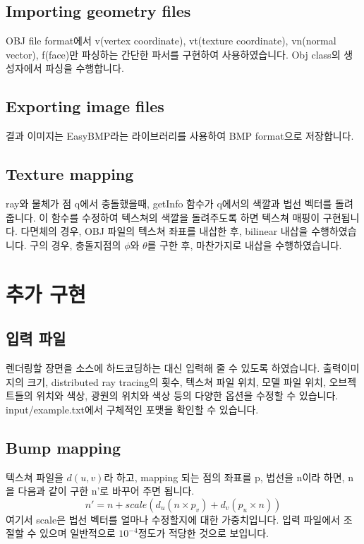 \documentclass{article}
\begin{document}
\subsection{Importing geometry files}

OBJ file format에서 v(vertex coordinate), vt(texture coordinate), vn(normal vector), f(face)만 파싱하는 간단한 파서를 구현하여 사용하였습니다.
Obj class의 생성자에서 파싱을 수행합니다.

\subsection{Exporting image files}

결과 이미지는 EasyBMP라는 라이브러리를 사용하여 BMP format으로 저장합니다.

\subsection{Texture mapping}

ray와 물체가 점 q에서 충돌했을때, getInfo 함수가 q에서의 색깔과 법선 벡터를 돌려줍니다.
이 함수를 수정하여 텍스쳐의 색깔을 돌려주도록 하면 텍스쳐 매핑이 구현됩니다.
다면체의 경우, OBJ 파일의 텍스쳐 좌표를 내삽한 후, bilinear 내삽을 수행하였습니다.
구의 경우, 충돌지점의 $\phi$와 $\theta$를 구한 후, 마찬가지로 내삽을 수행하였습니다.

\section{추가 구현}

\subsection{입력 파일}

렌더링할 장면을 소스에 하드코딩하는 대신 입력해 줄 수 있도록 하였습니다.
출력이미지의 크기, distributed ray tracing의 횟수, 텍스쳐 파일 위치, 모델 파일 위치, 오브젝트들의 위치와 색상, 광원의 위치와 색상 등의 다양한 옵션을 수정할 수 있습니다.
input/example.txt에서 구체적인 포맷을 확인할 수 있습니다.

\subsection{Bump mapping}

텍스쳐 파일을 $d(u,v)$라 하고, mapping 되는 점의 좌표를 p, 법선을 n이라 하면, n을 다음과 같이 구한 n'로 바꾸어 주면 됩니다.
\begin{equation*}
  n'=n+scale(d_u(n \times p_v)+d_v(p_u \times n))
\end{equation*}
여기서 scale은 법선 벡터를 얼마나 수정할지에 대한 가중치입니다. 입력 파일에서 조절할 수 있으며 일반적으로 $10^{-4}$정도가 적당한 것으로 보입니다.
\end{document}
